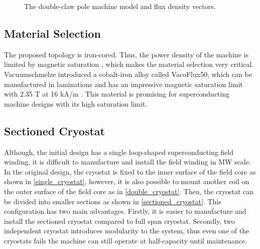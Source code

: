 \documentclass[12pt]{iopart}
\begin{document}
\begin{figure}[]
  \caption{The double-claw pole machine model and flux density vectors.} 
  \label{double_claw_parts}
\end{figure}

\subsection{Material Selection}

The proposed topology is iron-cored. Thus, the power density of the machine is limited by magnetic saturation , which makes the material selection very critical.  Vacuumschmelze introduced a cobalt-iron alloy called VacoFlux50, which  can be manufactured in laminations and has an impressive magnetic saturation limit with 2.35 T at 16 kA/m \cite{vacoflux}. This material is promising for superconducting machine designs with its high saturation limit.

\subsection{Sectioned Cryostat}

Although, the initial design has a single loop-shaped superconducting field winding, it is difficult to manufacture and install the field winding in MW scale. In the original design, the cryostat is fixed to the inner surface of the field core as shown in \ref{single_cryostat}, however, it is also possible to mount another coil on the outer surface of the field core as in \ref{double_cryostat}. Then, the cryostat can be divided into smaller sections as shown in \ref{sectioned_cryostat}. This configuration has two main advantages. Firstly, it is easier to manufacture and install the sectioned cryostat compared to full span cryostat. Secondly, two independent cryostat introduces modularity to the system, thus even one of the cryostats fails  the machine can still operate at half-capacity until maintenance.
 
\end{document}
